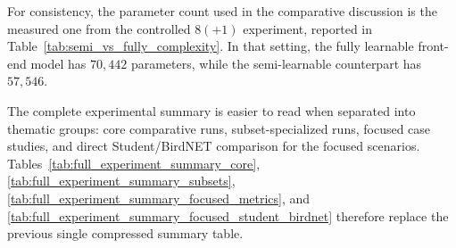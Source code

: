 \documentclass[a4paper,singleside,12pt]{report} %
\begin{document}
	For consistency, the parameter count used in the comparative discussion is the measured one from the controlled \(8(+1)\) experiment, reported in Table~\ref{tab:semi_vs_fully_complexity}. In that setting, the fully learnable front-end model has \(70{,}442\) parameters, while the semi-learnable counterpart has \(57{,}546\).

	The complete experimental summary is easier to read when separated into thematic groups: core comparative runs, subset-specialized runs, focused case studies, and direct Student/BirdNET comparison for the focused scenarios. Tables~\ref{tab:full_experiment_summary_core}, \ref{tab:full_experiment_summary_subsets}, \ref{tab:full_experiment_summary_focused_metrics}, and \ref{tab:full_experiment_summary_focused_student_birdnet} therefore replace the previous single compressed summary table.

	\begin{table}[H]
		\centering
		\scriptsize
		\renewcommand{\arraystretch}{1.15}
		\setlength{\tabcolsep}{4pt}
		\caption{Adapted experimental summary for the full project: core comparative runs.}
		\label{tab:full_experiment_summary_core}
	\end{table}
\end{document}
